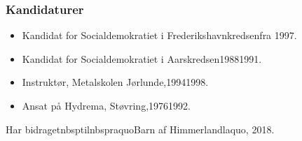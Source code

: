 \documentclass[11pt, a4paper]{awesome-cv}
\begin{document}
\begin{cvletter}
\subsubsection*{Kandidaturer}
\begin{itemize}
\item Kandidat for Socialdemokratiet i Frederikshavnkredsenfra 1997.
\item Kandidat for Socialdemokratiet i Aarskredsen19881991.
\end{itemize}
\begin{itemize}
\item Instruktør, Metalskolen Jørlunde,19941998.
\item Ansat på Hydrema, Støvring,19761992.
\end{itemize}
Har bidragetnbsptilnbspraquoBarn af Himmerlandlaquo, 2018.

\end{cvletter}
\end{document}
